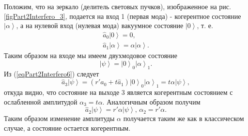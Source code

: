 

Положим, что на зеркало (делитель световых пучков), изображенное на
рис. \ref{figPart2Interfero_3}, подается на вход 1 (первая мода) -
когерентное состояние $\left|\alpha\right>$, а на нулевой вход
(нулевая мода) вакуумное состояние $\left|0\right>$, т. е.
\begin{eqnarray}
\hat{a}_0 \left|0\right> = 0,
\nonumber \\
\hat{a}_1 \left|\alpha\right> = \alpha \left|\alpha\right>.
\nonumber
\end{eqnarray}
Таким образом на входе мы имеем двухмодовое состояние 
\[
\left|\psi\right> = \left|0\right>_0 \left|\alpha\right>_1.
\]
Из (\ref{eqPart2Interfero6}) следует 
\begin{equation}
\hat{a}_3\left|\psi\right> = 
\left(r' \hat{a}_0 + t \hat{a}_1\right)\left|0\right>_0
\left|\alpha\right>_1 = 
t \alpha \left|\psi\right>,
\nonumber
\end{equation}
откуда видно, что состояние на выходе 3 является когерентным состоянием
с ослабленной амплитудой $\alpha_3 = t \alpha$. 
Аналогичным образом получим
\begin{equation}
\hat{a}_2\left|\psi\right> = 
r' \alpha \left|\psi\right>, \, \alpha_2 = r'\alpha.
\label{eqPart2InterferoTask3}
\end{equation}
Таким образом изменение амплитуды $\alpha$ получается таким же как в
классическом случае, а состояние остается когерентным.

